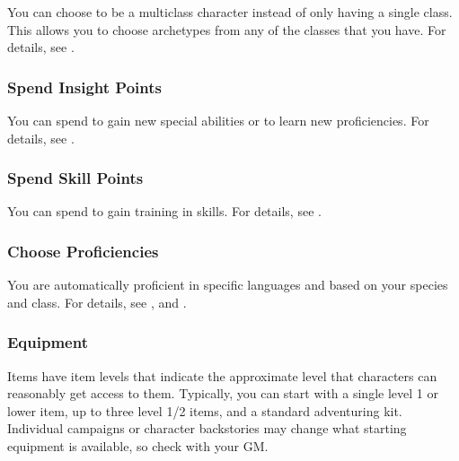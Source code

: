             You can choose to be a multiclass character instead of only having a single class.
            This allows you to choose archetypes from any of the classes that you have.
            For details, see .

        \subsubsection{Spend Insight Points}
            You can spend  to gain new special abilities or to learn new proficiencies.
            For details, see .

        \subsubsection{Spend Skill Points}
            You can spend  to gain training in skills.
            For details, see .

        \subsubsection{Choose Proficiencies}
            You are automatically proficient in specific languages and  based on your species and class.
            For details, see , and .

        \subsubsection{Equipment}
            Items have item levels that indicate the approximate level that characters can reasonably get access to them.
            Typically, you can start with a single level 1 or lower item, up to three level 1/2 items, and a standard adventuring kit.
            Individual campaigns or character backstories may change what starting equipment is available, so check with your GM.

